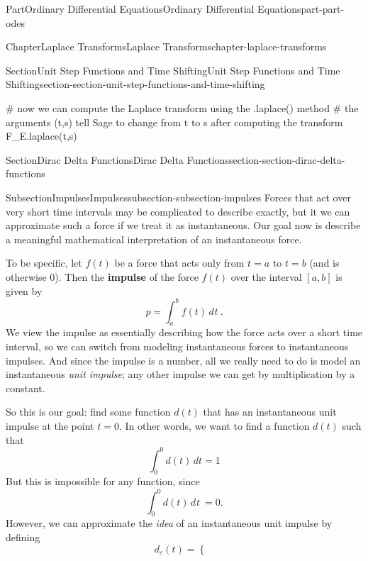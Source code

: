 \documentclass[twoside,10pt,]{book}
\newcommand{\terminology}[1]{\textbf{#1}}
\numberwithin{equation}{part}
\newcommand{\dd}[2][]{\, d^{#1} #2\ }
\begin{document}
\begin{partptx}{Part}{Ordinary Differential Equations}{}{Ordinary Differential Equations}{}{}{part-part-odes}
\begin{chapterptx}{Chapter}{Laplace Transforms}{}{Laplace Transforms}{}{}{chapter-laplace-transforms}
\begin{sectionptx}{Section}{Unit Step Functions and Time Shifting}{}{Unit Step Functions and Time Shifting}{}{}{section-section-unit-step-functions-and-time-shifting}
\begin{sageinput}
# now we can compute the Laplace transform using the .laplace() method
# the arguments (t,s) tell Sage to change from t to s after computing the transform
F_E.laplace(t,s)
\end{sageinput}
\end{sectionptx}
%
%
\typeout{************************************************}
\typeout{************************************************}
%
\begin{sectionptx}{Section}{Dirac Delta Functions}{}{Dirac Delta Functions}{}{}{section-section-dirac-delta-functions}
%
%
\typeout{************************************************}
\typeout{************************************************}
%
\begin{subsectionptx}{Subsection}{Impulses}{}{Impulses}{}{}{subsection-subsection-impulses}
Forces that act over very short time intervals may be complicated to describe exactly, but it we can approximate such a force if we treat it as instantaneous. Our goal now is describe a meaningful mathematical interpretation of an instantaneous force.%
\par
To be specific, let \(f(t)\) be a force that acts only from \(t=a\) to \(t=b\) (and is otherwise \(0\)). Then the \terminology{impulse} of the force \(f(t)\) over the interval \([a,b]\) is given by%
\begin{equation*}
p = \int_{a}^{b}f(t)\dd{t}.
\end{equation*}
We view the impulse as essentially describing how the force acts over a short time interval, so we can switch from modeling instantaneous forces to instantaneous impulses. And since the impulse is a number, all we really need to do is model an instantaneous \emph{unit impulse}; any other impulse we can get by multiplication by a constant.%
\par
So this is our goal: find some function \(d(t)\) that has an instantaneous unit impulse at the point \(t=0\). In other words, we want to find a function \(d(t)\) such that%
\begin{equation*}
\int_{0}^{0}d(t)\,dt = 1
\end{equation*}
But this is impossible for any function, since%
\begin{equation*}
\int_{0}^{0}d(t)\dd{t} = 0.
\end{equation*}
However, we can approximate the \emph{idea} of an instantaneous unit impulse by defining%
\begin{equation*}
d_{\varepsilon}(t) = 
\begin{cases}

\end{cases}
\end{equation*}
\end{subsectionptx}
\end{sectionptx}
\end{chapterptx}
\end{partptx}
\end{document}

